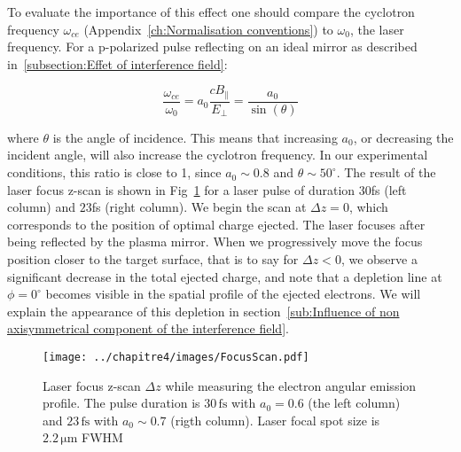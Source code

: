 \noindent To evaluate the importance of this effect one should compare the cyclotron frequency $\omega_{ce}$ (Appendix~\ref{ch:Normalisation conventions}) to $\omega_{0}$, the laser frequency. For a p-polarized pulse reflecting on an ideal mirror as described in~\ref{subsection:Effet of interference field}:

$$
\frac{\omega_{ce}}{\omega_0} = a_0\frac{cB_{\parallel}}{E_{\perp}} = \frac{a_0}{\sin(\theta)} 
$$




\noindent where $\theta$ is the angle of incidence. This means that increasing $a_0$, or decreasing the incident angle, will also increase the cyclotron frequency. In our experimental conditions, this ratio is close to 1, since $a_0\sim 0.8$ and $\theta \sim 50^{\circ}$. The result of the laser focus z-scan is shown in Fig~\ref{fig:FocusScan} for a laser pulse of duration $30$fs (left column) and $23$fs (right column). We begin the scan at $\Delta z = 0$, which corresponds to the position of optimal charge ejected. The laser focuses after being reflected by the plasma mirror. When we progressively move the focus position closer to the target surface, that is to say for $\Delta z <0$, we observe a significant decrease in the total ejected charge, and note that a depletion line at $\phi = 0^{\circ}$ becomes visible in the spatial profile of the ejected electrons. We will explain the appearance of this depletion in section~\ref{sub:Influence of non axisymmetrical component of the interference field}.


\begin{figure}[H]
\centering
\texttt{[image: ../chapitre4/images/FocusScan.pdf]}\\
\caption{\label{fig:FocusScan}Laser focus z-scan $\Delta z$ while measuring the electron angular emission profile. The pulse duration is $30\,\mathrm{fs}$ with $a_0 = 0.6$ (the left column) and $23\,\mathrm{fs}$ with $a_0 \sim 0.7$ (rigth column). Laser focal spot size is $2.2\,\mathrm{\mu m}$ FWHM}
\end{figure}



